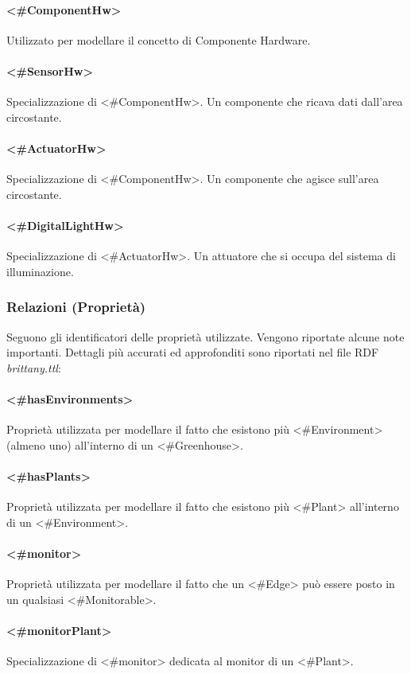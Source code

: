 \paragraph{<\#ComponentHw>}
Utilizzato per modellare il concetto di Componente Hardware.
\paragraph{<\#SensorHw>}
Specializzazione di <\#ComponentHw>. Un componente che ricava dati dall'area circostante.
\paragraph{<\#ActuatorHw>}
Specializzazione di <\#ComponentHw>. Un componente che agisce sull'area circostante.
\paragraph{<\#DigitalLightHw>}
Specializzazione di <\#ActuatorHw>. Un attuatore che si occupa del sistema di illuminazione.

\subsubsection{Relazioni (Proprietà)}
Seguono gli identificatori delle proprietà utilizzate. Vengono riportate alcune note importanti. Dettagli più accurati ed approfonditi sono riportati nel file RDF \textit{brittany.ttl}:

\paragraph{<\#hasEnvironments>}
Proprietà utilizzata per modellare il fatto che esistono più <\#Environment> (almeno uno) all'interno di un <\#Greenhouse>.
\paragraph{<\#hasPlants>}
Proprietà utilizzata per modellare il fatto che esistono più <\#Plant> all'interno di un <\#Environment>.
\paragraph{<\#monitor>}
Proprietà utilizzata per modellare il fatto che un <\#Edge> può essere posto in un qualsiasi <\#Monitorable>.
\paragraph{<\#monitorPlant>}
Specializzazione di <\#monitor> dedicata al monitor di un <\#Plant>.
